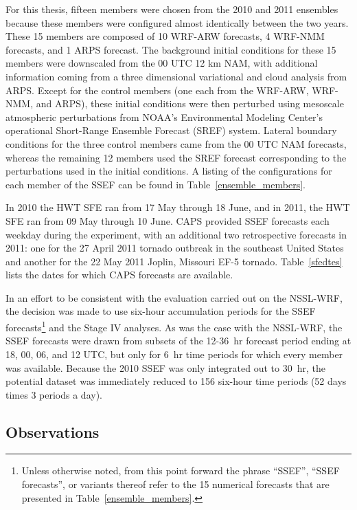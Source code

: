 For this thesis, fifteen members were chosen from the 2010 and 2011 ensembles because these members were configured almost identically between the two years.
These 15 members are composed of 10 WRF-ARW forecasts, 4 WRF-NMM forecasts, and 1 ARPS forecast.
The background initial conditions for these 15 members were downscaled from the 00 UTC 12 km NAM, with additional information coming from a three dimensional variational and cloud analysis from ARPS.
Except for the control members (one each from the WRF-ARW, WRF-NMM, and ARPS), these initial conditions were then perturbed using mesoscale atmospheric perturbations from NOAA's Environmental Modeling Center's operational Short-Range Ensemble Forecast (SREF) system.
Lateral boundary conditions for the three control members came from the 00 UTC NAM forecasts, whereas the remaining 12 members used the SREF forecast corresponding to the perturbations used in the initial conditions.
A listing of the configurations for each member of the SSEF can be found in \mbox{Table \ref{ensemble_members}}.


In 2010 the HWT SFE ran from 17 May through 18 June, and in 2011, the HWT SFE ran from 09  May through 10 June.
CAPS provided SSEF forecasts each weekday during the experiment, with an additional two retrospective forecasts in 2011: one for the 27 April 2011 tornado outbreak in the southeast United States and another for the 22 May 2011 Joplin, Missouri EF-5 tornado.
\mbox{Table \ref{sfedtes}} lists the dates for which CAPS forecasts are available.


In an effort to be consistent with the evaluation carried out on the NSSL-WRF, the decision was made to use six-hour accumulation periods for the SSEF forecasts\footnote{Unless otherwise noted, from this point forward the phrase ``SSEF'', ``SSEF forecasts'', or variants thereof refer to the 15 numerical forecasts that are presented in \mbox{Table \ref{ensemble_members}}.} and the Stage IV analyses.
As was the case with the NSSL-WRF, the SSEF forecasts were drawn from subsets of the \mbox{12-36 hr} forecast period ending at 18, 00, 06, and 12 UTC, but only for \mbox{6 hr} time periods for which every member was available.
Because the 2010 SSEF was only integrated out to \mbox{30 hr}, the potential dataset was immediately reduced to 156 six-hour time periods (52 days times 3 periods a day).




\subsection{Observations}
\label{eobservations}

